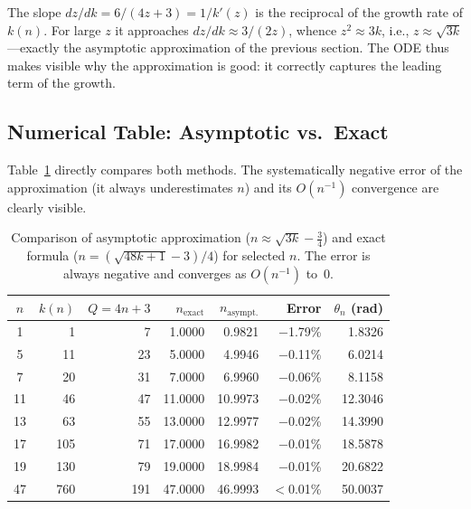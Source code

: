 \begin{bemerkung}
The slope $dz/dk = 6/(4z+3) = 1/k'(z)$ is the reciprocal of the
growth rate of $k(n)$. For large $z$ it approaches
$dz/dk \approx 3/(2z)$, whence $z^2 \approx 3k$, i.e.,
$z \approx \sqrt{3k}$---exactly the asymptotic approximation
of the previous section. The ODE thus makes visible why the
approximation is good: it correctly captures the leading term
of the growth.
\end{bemerkung}

\subsection{Numerical Table: Asymptotic vs.\ Exact}
\label{subsec:tabelle}

Table~\ref{tab:helix_numerisch} directly compares both methods.
The systematically negative error of the approximation (it always
underestimates $n$) and its $O(n^{-1})$ convergence
are clearly visible.

\begin{table}[H]
\centering
\renewcommand{\arraystretch}{1.25}
\caption{Comparison of asymptotic approximation ($n \approx \sqrt{3k}-\tfrac{3}{4}$)
  and exact formula ($n = (\sqrt{48k+1}-3)/4$) for selected $n$.
  The error is always negative and converges as $O(n^{-1})$ to~$0$.}
\begin{tabular}{crrrrrr}
\toprule
$n$ & $k(n)$ & $Q = 4n+3$ & $n_{\mathrm{exact}}$ &
  $n_{\mathrm{asympt.}}$ & Error & $\theta_n$ (rad) \\
\midrule
 1 &   1 &   7 &  1.0000 &  0.9821 & $-$1.79\% &  1.8326 \\
 5 &  11 &  23 &  5.0000 &  4.9946 & $-$0.11\% &  6.0214 \\
 7 &  20 &  31 &  7.0000 &  6.9960 & $-$0.06\% &  8.1158 \\
11 &  46 &  47 & 11.0000 & 10.9973 & $-$0.02\% & 12.3046 \\
13 &  63 &  55 & 13.0000 & 12.9977 & $-$0.02\% & 14.3990 \\
17 & 105 &  71 & 17.0000 & 16.9982 & $-$0.01\% & 18.5878 \\
19 & 130 &  79 & 19.0000 & 18.9984 & $-$0.01\% & 20.6822 \\
47 & 760 & 191 & 47.0000 & 46.9993 & $<$0.01\% & 50.0037 \\
\bottomrule
\end{tabular}
\label{tab:helix_numerisch}
\end{table}

